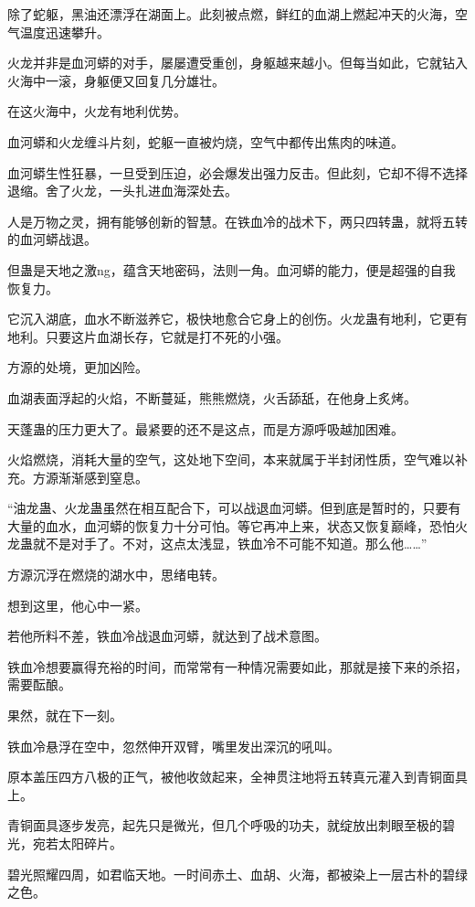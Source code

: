 \begin{this_body}
除了蛇躯，黑油还漂浮在湖面上。此刻被点燃，鲜红的血湖上燃起冲天的火海，空气温度迅速攀升。

火龙并非是血河蟒的对手，屡屡遭受重创，身躯越来越小。但每当如此，它就钻入火海中一滚，身躯便又回复几分雄壮。

在这火海中，火龙有地利优势。

血河蟒和火龙缠斗片刻，蛇躯一直被灼烧，空气中都传出焦肉的味道。

血河蟒生性狂暴，一旦受到压迫，必会爆发出强力反击。但此刻，它却不得不选择退缩。舍了火龙，一头扎进血海深处去。

人是万物之灵，拥有能够创新的智慧。在铁血冷的战术下，两只四转蛊，就将五转的血河蟒战退。

但蛊是天地之激ng，蕴含天地密码，法则一角。血河蟒的能力，便是超强的自我恢复力。

它沉入湖底，血水不断滋养它，极快地愈合它身上的创伤。火龙蛊有地利，它更有地利。只要这片血湖长存，它就是打不死的小强。

方源的处境，更加凶险。

血湖表面浮起的火焰，不断蔓延，熊熊燃烧，火舌舔舐，在他身上炙烤。

天蓬蛊的压力更大了。最紧要的还不是这点，而是方源呼吸越加困难。

火焰燃烧，消耗大量的空气，这处地下空间，本来就属于半封闭性质，空气难以补充。方源渐渐感到窒息。

“油龙蛊、火龙蛊虽然在相互配合下，可以战退血河蟒。但到底是暂时的，只要有大量的血水，血河蟒的恢复力十分可怕。等它再冲上来，状态又恢复巅峰，恐怕火龙蛊就不是对手了。不对，这点太浅显，铁血冷不可能不知道。那么他……”

方源沉浮在燃烧的湖水中，思绪电转。

想到这里，他心中一紧。

若他所料不差，铁血冷战退血河蟒，就达到了战术意图。

铁血冷想要赢得充裕的时间，而常常有一种情况需要如此，那就是接下来的杀招，需要酝酿。

果然，就在下一刻。

铁血冷悬浮在空中，忽然伸开双臂，嘴里发出深沉的吼叫。

原本盖压四方八极的正气，被他收敛起来，全神贯注地将五转真元灌入到青铜面具上。

青铜面具逐步发亮，起先只是微光，但几个呼吸的功夫，就绽放出刺眼至极的碧光，宛若太阳碎片。

碧光照耀四周，如君临天地。一时间赤土、血胡、火海，都被染上一层古朴的碧绿之色。


\end{this_body}
